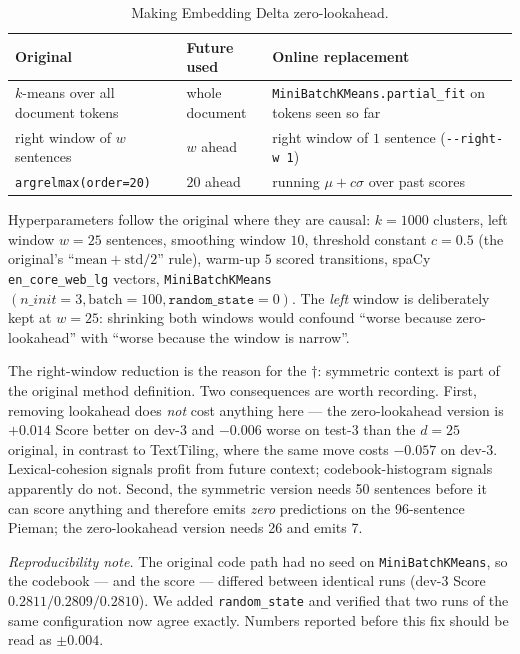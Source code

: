 \begin{table}[t]
\centering\small
\begin{tabular}{@{}p{}p{}p{}@{}}
\toprule
Original & Future used & Online replacement \\
\midrule
$k$-means over all document tokens & whole document &
\texttt{MiniBatchKMeans.partial\_fit} on tokens seen so far \\
right window of $w$ sentences & $w$ ahead &
right window of $1$ sentence (\texttt{-{}-right-w 1}) \\
\texttt{argrelmax(order=20)} & $20$ ahead &
running $\mu + c\sigma$ over past scores \\
\bottomrule
\end{tabular}
\caption{Making Embedding Delta zero-lookahead.}
\label{tab:app-embdelta}
\end{table}

Hyperparameters follow the original where they are causal: $k=1000$ clusters,
left window $w=25$ sentences, smoothing window $10$, threshold constant
$c=0.5$ (the original's ``$\mathrm{mean}+\mathrm{std}/2$'' rule), warm-up $5$
scored transitions, spaCy \texttt{en\_core\_web\_lg} vectors,
\texttt{MiniBatchKMeans}$(n\_init{=}3, \text{batch}{=}100,
\texttt{random\_state}{=}0)$. The \emph{left} window is deliberately kept at
$w=25$: shrinking both windows would confound ``worse because zero-lookahead''
with ``worse because the window is narrow''.

The right-window reduction is the reason for the $\dagger$: symmetric context is
part of the original method definition. Two consequences are worth recording.
First, removing lookahead does \emph{not} cost anything here --- the
zero-lookahead version is $+0.014$ Score better on dev-3 and $-0.006$ worse on
test-3 than the $d{=}25$ original, in contrast to TextTiling, where the same
move costs $-0.057$ on dev-3. Lexical-cohesion signals profit from future
context; codebook-histogram signals apparently do not. Second, the symmetric
version needs 50 sentences before it can score anything and therefore emits
\emph{zero} predictions on the 96-sentence Pieman; the zero-lookahead version
needs 26 and emits 7.

\emph{Reproducibility note.} The original code path had no seed on
\texttt{MiniBatchKMeans}, so the codebook --- and the score --- differed between
identical runs (dev-3 Score $0.2811 / 0.2809 / 0.2810$). We added
\texttt{random\_state} and verified that two runs of the same configuration now
agree exactly. Numbers reported before this fix should be read as
$\pm 0.004$.

